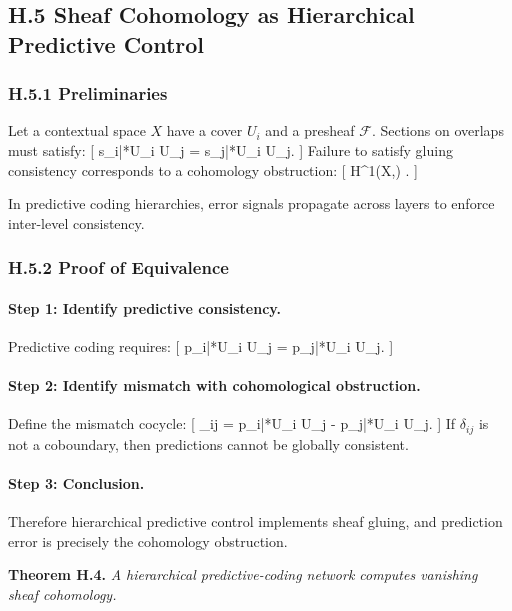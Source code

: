 \documentclass[11pt,a4paper,twoside]{article}
\begin{document}
\subsection*{H.5 Sheaf Cohomology as Hierarchical Predictive Control}

\subsubsection*{H.5.1 Preliminaries}

Let a contextual space $X$ have a cover ${U_i}$ and a presheaf $\mathcal{F}$. Sections on overlaps must satisfy:
[
s_i|*{U_i \cap U_j} = s_j|*{U_i \cap U_j}.
]
Failure to satisfy gluing consistency corresponds to a cohomology obstruction:
[
H^1(X,) .
]

In predictive coding hierarchies, error signals propagate across layers to enforce inter-level consistency.

\subsubsection*{H.5.2 Proof of Equivalence}

\paragraph{Step 1: Identify predictive consistency.}

Predictive coding requires:
[
p_i|*{U_i \cap U_j} = p_j|*{U_i \cap U_j}.
]

\paragraph{Step 2: Identify mismatch with cohomological obstruction.}

Define the mismatch cocycle:
[
\delta_{ij}
= p_i|*{U_i \cap U_j} - p_j|*{U_i \cap U_j}.
]
If ${\delta_{ij}}$ is not a coboundary, then predictions cannot be globally consistent.

\paragraph{Step 3: Conclusion.}

Therefore hierarchical predictive control implements sheaf gluing, and prediction error is precisely the cohomology obstruction.

\medskip

\noindent\textbf{Theorem H.4.}
\emph{A hierarchical predictive-coding network computes vanishing sheaf cohomology.}
\end{document}
